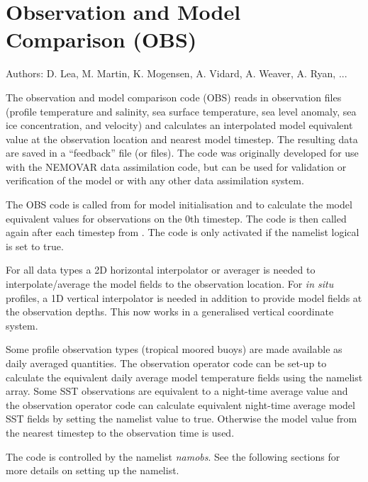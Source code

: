 \documentclass[../main/NEMO_manual]{subfiles}
\begin{document}
\chapter{Observation and Model Comparison (OBS)}
\label{chap:OBS}

Authors: D. Lea, M. Martin, K. Mogensen, A. Vidard, A. Weaver, A. Ryan, ...   %

\minitoc

\newpage

The observation and model comparison code (OBS) reads in observation files
(profile temperature and salinity, sea surface temperature, sea level anomaly, sea ice concentration, and velocity) and calculates an interpolated model equivalent value at the observation location and nearest model timestep.
The resulting data are saved in a ``feedback'' file (or files).
The code was originally developed for use with the NEMOVAR data assimilation code,
but can be used for validation or verification of the model or with any other data assimilation system.

The OBS code is called from  for model initialisation and to calculate the model equivalent values for observations on the 0th timestep.
The code is then called again after each timestep from .
The code is only activated if the namelist logical  is set to true.

For all data types a 2D horizontal interpolator or averager is needed to
interpolate/average the model fields to the observation location.
For {\em in situ} profiles, a 1D vertical interpolator is needed in addition to
provide model fields at the observation depths.
This now works in a generalised vertical coordinate system. 

Some profile observation types (\eg tropical moored buoys) are made available as daily averaged quantities.
The observation operator code can be set-up to calculate the equivalent daily average model temperature fields using
the  namelist array.
Some SST observations are equivalent to a night-time average value and
the observation operator code can calculate equivalent night-time average model SST fields by
setting the namelist value  to true.
Otherwise the model value from the nearest timestep to the observation time is used.

The code is controlled by the namelist \textit{namobs}.
See the following sections for more details on setting up the namelist.
\end{document}
